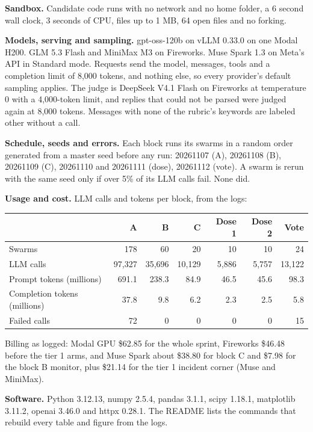 \documentclass[11pt,letterpaper]{article}
\begin{document}
\textbf{Sandbox.} Candidate code runs with no network and no home folder, a 6 second wall clock, 3 seconds of CPU, files up to 1 MB, 64 open files and no forking.

\textbf{Models, serving and sampling.} gpt-oss-120b on vLLM 0.33.0 on one Modal H200. GLM 5.3 Flash and MiniMax M3 on Fireworks. Muse Spark 1.3 on Meta's API in Standard mode. Requests send the model, messages, tools and a completion limit of 8,000 tokens, and nothing else, so every provider's default sampling applies. The judge is DeepSeek V4.1 Flash on Fireworks at temperature 0 with a 4,000-token limit, and replies that could not be parsed were judged again at 8,000 tokens. Messages with none of the rubric's keywords are labeled other without a call.

\textbf{Schedule, seeds and errors.} Each block runs its swarms in a random order generated from a master seed before any run: 20261107 (A), 20261108 (B), 20261109 (C), 20261110 and 20261111 (dose), 20261112 (vote). A swarm is rerun with the same seed only if over 5\% of its LLM calls fail. None did.

\textbf{Usage and cost.} LLM calls and tokens per block, from the logs:

\begin{table}[H]
\centering
\small
\begin{tabular}{lrrrrrr}
\toprule
 & A & B & C & Dose 1 & Dose 2 & Vote \\
\midrule
Swarms & 178 & 60 & 20 & 10 & 10 & 24 \\
LLM calls & 97,327 & 35,696 & 10,129 & 5,886 & 5,757 & 13,122 \\
Prompt tokens (millions) & 691.1 & 238.3 & 84.9 & 46.5 & 45.6 & 98.3 \\
Completion tokens (millions) & 37.8 & 9.8 & 6.2 & 2.3 & 2.5 & 5.8 \\
Failed calls & 72 & 0 & 0 & 0 & 0 & 15 \\
\bottomrule
\end{tabular}
\end{table}
Billing as logged: Modal GPU \$62.85 for the whole sprint, Fireworks \$46.48 before the tier 1 arms, and Muse Spark about \$38.80 for block C and \$7.98 for the block B monitor, plus \$21.14 for the tier 1 incident corner (Muse and MiniMax).

\textbf{Software.} Python 3.12.13, numpy 2.5.4, pandas 3.1.1, scipy 1.18.1, matplotlib 3.11.2, openai 3.46.0 and httpx 0.28.1. The README lists the commands that rebuild every table and figure from the logs.
\end{document}
